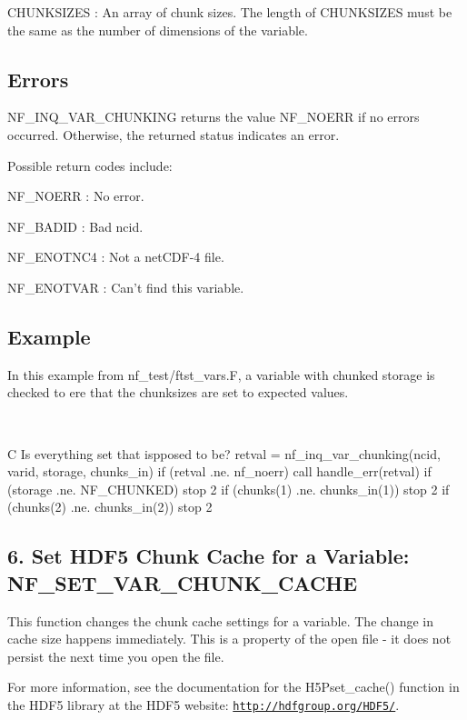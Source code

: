 {\ttfamily C\+H\+U\+N\+K\+S\+I\+Z\+ES} \+: An array of chunk sizes. The length of C\+H\+U\+N\+K\+S\+I\+Z\+ES must be the same as the number of dimensions of the variable.

\subsection*{Errors }

N\+F\+\_\+\+I\+N\+Q\+\_\+\+V\+A\+R\+\_\+\+C\+H\+U\+N\+K\+I\+NG returns the value N\+F\+\_\+\+N\+O\+E\+RR if no errors occurred. Otherwise, the returned status indicates an error.

Possible return codes include\+:

{\ttfamily N\+F\+\_\+\+N\+O\+E\+RR} \+: No error.

{\ttfamily N\+F\+\_\+\+B\+A\+D\+ID} \+: Bad ncid.

{\ttfamily N\+F\+\_\+\+E\+N\+O\+T\+N\+C4} \+: Not a net\+C\+D\+F-\/4 file.

{\ttfamily N\+F\+\_\+\+E\+N\+O\+T\+V\+AR} \+: Can’t find this variable.

\subsection*{Example }

In this example from nf\+\_\+test/ftst\+\_\+vars.\+F, a variable with chunked storage is checked to ere that the chunksizes are set to expected values.

 

C Is everything set that ispposed to be? retval = nf\+\_\+inq\+\_\+var\+\_\+chunking(ncid, varid, storage, chunks\+\_\+in) if (retval .ne. nf\+\_\+noerr) call handle\+\_\+err(retval) if (storage .ne. N\+F\+\_\+\+C\+H\+U\+N\+K\+ED) stop 2 if (chunks(1) .ne. chunks\+\_\+in(1)) stop 2 if (chunks(2) .ne. chunks\+\_\+in(2)) stop 2

\subsection*{6. Set H\+D\+F5 Chunk Cache for a Variable\+: N\+F\+\_\+\+S\+E\+T\+\_\+\+V\+A\+R\+\_\+\+C\+H\+U\+N\+K\+\_\+\+C\+A\+C\+HE }

This function changes the chunk cache settings for a variable. The change in cache size happens immediately. This is a property of the open file -\/ it does not persist the next time you open the file.

For more information, see the documentation for the H5\+Pset\+\_\+cache() function in the H\+D\+F5 library at the H\+D\+F5 website\+: \href{http://hdfgroup.org/HDF5/}{\tt http\+://hdfgroup.\+org/\+H\+D\+F5/}.

